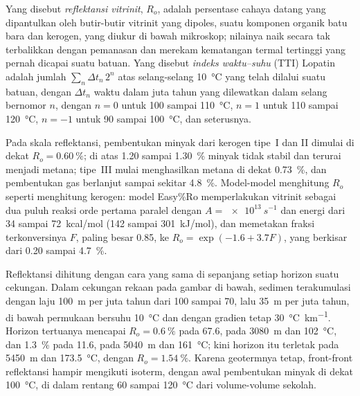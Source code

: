 \begin{definition}\label{def:b2:energy-geology:maturity}
Yang disebut \emph{reflektansi vitrinit}, $R_o$, adalah persentase cahaya
datang yang dipantulkan oleh butir-butir vitrinit yang dipoles, suatu komponen organik batu bara dan kerogen,
yang diukur di bawah mikroskop; nilainya naik secara tak terbalikkan dengan pemanasan dan merekam kematangan termal tertinggi yang pernah dicapai suatu batuan. Yang disebut
\emph{indeks waktu--suhu} (TTI) Lopatin adalah jumlah
$\sum_n \Delta t_n\,2^n$ atas selang-selang \qty{10}{\celsius} yang telah dilalui suatu batuan,
dengan $\Delta t_n$ waktu dalam juta tahun yang dilewatkan dalam selang bernomor $n$, dengan $n = 0$
untuk 100 sampai \qty{110}{\celsius}, $n = 1$ untuk 110 sampai \qty{120}{\celsius}, $n = -1$ untuk 90 sampai
\qty{100}{\celsius}, dan seterusnya.
\end{definition}

Pada skala reflektansi, pembentukan minyak dari kerogen tipe~I dan II dimulai di dekat $R_o =
\qty{0.60}{\percent}$; di atas 1.20 sampai \qty{1.30}{\percent} minyak tidak stabil dan terurai menjadi
metana; tipe~III mulai menghasilkan metana di dekat \qty{0.73}{\percent}, dan pembentukan gas berlanjut sampai
sekitar \qty{4.8}{\percent}. Model-model menghitung $R_o$ seperti menghitung kerogen: model Easy\%Ro
memperlakukan vitrinit sebagai dua puluh reaksi orde pertama paralel dengan $A = \qty{e13}{s^{-1}}$ dan energi
dari 34 sampai \qty{72}{kcal/mol} (142 sampai \qty{301}{kJ/mol}), dan memetakan fraksi terkonversinya $F$,
paling besar 0.85, ke $R_o = \exp(-1.6 + 3.7F)$, yang berkisar dari 0.20 sampai \qty{4.7}{\percent}.

Reflektansi dihitung dengan cara yang sama di sepanjang setiap horizon suatu cekungan. Dalam cekungan rekaan pada
gambar di bawah, sedimen terakumulasi dengan laju \qty{100}{m} per juta tahun dari 100 sampai \qty{70}{\Ma},
lalu \qty{35}{m} per juta tahun, di bawah permukaan bersuhu \qty{10}{\celsius} dan dengan gradien tetap
\qty{30}{\celsius\per\km}. Horizon tertuanya mencapai $R_o = \qty{0.6}{\percent}$ pada
\qty{67.6}{\Ma}, pada \qty{3080}{m} dan \qty{102}{\celsius}, dan \qty{1.3}{\percent} pada
\qty{11.6}{\Ma}, pada \qty{5040}{m} dan \qty{161}{\celsius}; kini horizon itu terletak pada \qty{5450}{m} dan
\qty{173.5}{\celsius}, dengan $R_o = \qty{1.54}{\percent}$. Karena geotermnya tetap, front-front
reflektansi hampir mengikuti isoterm, dengan awal pembentukan minyak di dekat
\qty{100}{\celsius}, di dalam rentang 60 sampai \qty{120}{\celsius} dari volume-volume sekolah.

